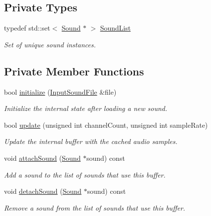 \subsection*{Private Types}
\begin{DoxyCompactItemize}
\item 
\mbox{\label{classsf_1_1_sound_buffer_a0c4edd90a4c83b07369e84f14b385196}} 
typedef std\+::set$<$ \mbox{\hyperlink{classsf_1_1_sound}{Sound}} $\ast$ $>$ \mbox{\hyperlink{classsf_1_1_sound_buffer_a0c4edd90a4c83b07369e84f14b385196}{Sound\+List}}
\begin{DoxyCompactList}\small\item\em Set of unique sound instances. \end{DoxyCompactList}\end{DoxyCompactItemize}
\subsection*{Private Member Functions}
\begin{DoxyCompactItemize}
\item 
bool \mbox{\hyperlink{classsf_1_1_sound_buffer_aa3c563ecb5a554c8975d93044be6fc54}{initialize}} (\mbox{\hyperlink{classsf_1_1_input_sound_file}{Input\+Sound\+File}} \&file)
\begin{DoxyCompactList}\small\item\em Initialize the internal state after loading a new sound. \end{DoxyCompactList}\item 
bool \mbox{\hyperlink{classsf_1_1_sound_buffer_afaa542a4b59ac4e8c4f4d163ea61c7e6}{update}} (unsigned int channel\+Count, unsigned int sample\+Rate)
\begin{DoxyCompactList}\small\item\em Update the internal buffer with the cached audio samples. \end{DoxyCompactList}\item 
void \mbox{\hyperlink{classsf_1_1_sound_buffer_a2761144856e452446cc26fda484b2b16}{attach\+Sound}} (\mbox{\hyperlink{classsf_1_1_sound}{Sound}} $\ast$sound) const
\begin{DoxyCompactList}\small\item\em Add a sound to the list of sounds that use this buffer. \end{DoxyCompactList}\item 
void \mbox{\hyperlink{classsf_1_1_sound_buffer_a02732b7adfaad67c931e2494a14a7027}{detach\+Sound}} (\mbox{\hyperlink{classsf_1_1_sound}{Sound}} $\ast$sound) const
\begin{DoxyCompactList}\small\item\em Remove a sound from the list of sounds that use this buffer. \end{DoxyCompactList}\end{DoxyCompactItemize}
